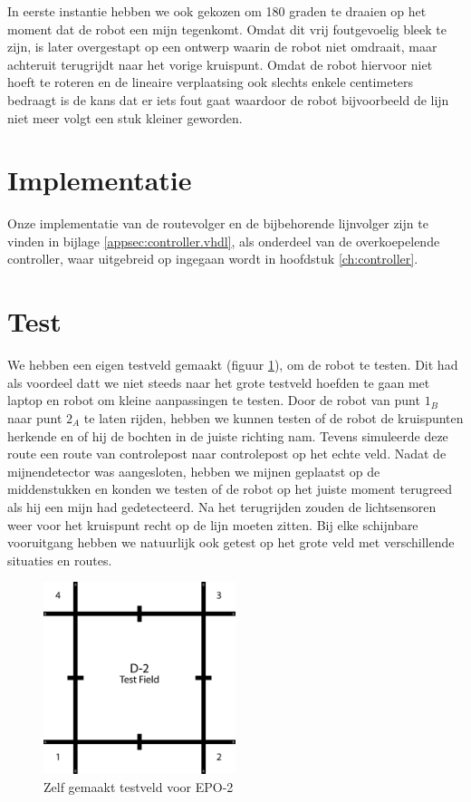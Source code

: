 \documentclass{report}
\begin{document}
In eerste instantie hebben we ook gekozen om 180 graden te draaien op het moment dat de robot een mijn tegenkomt. Omdat dit vrij foutgevoelig bleek te zijn, is later overgestapt op een ontwerp waarin de robot niet omdraait, maar achteruit terugrijdt naar het vorige kruispunt. Omdat de robot hiervoor niet hoeft te roteren en de lineaire verplaatsing ook slechts enkele centimeters bedraagt is de kans dat er iets fout gaat waardoor de robot bijvoorbeeld de lijn niet meer volgt een stuk kleiner geworden.

\section{Implementatie}
Onze implementatie van de routevolger en de bijbehorende lijnvolger zijn te vinden in bijlage \ref{appsec:controller.vhdl}, als onderdeel van de overkoepelende controller, waar uitgebreid op ingegaan wordt in hoofdstuk \ref{ch:controller}.

\section{Test}
We hebben een eigen testveld gemaakt (figuur \ref{fig:testfield}), om de robot te testen. Dit had als voordeel datt we niet steeds naar het grote testveld hoefden te gaan met laptop en robot om kleine aanpassingen te testen.
Door de robot van punt $1_B$ naar punt $2_A$ te laten rijden, hebben we kunnen testen of de robot de kruispunten herkende en of hij de bochten in de juiste richting nam. Tevens simuleerde deze route een route van controlepost naar controlepost op het echte veld.
Nadat de mijnendetector was aangesloten, hebben we mijnen geplaatst op de middenstukken en konden we testen of de robot op het juiste moment terugreed als hij een mijn had gedetecteerd. Na het terugrijden zouden de lichtsensoren weer voor het kruispunt recht op de lijn moeten zitten.
Bij elke schijnbare vooruitgang hebben we natuurlijk ook getest op het grote veld met verschillende situaties en routes.

\begin{figure}[H]
	\centering
	\includegraphics[width=0.5\textwidth]{d-2_test_field.png}
	\caption{Zelf gemaakt testveld voor EPO-2}
	\label{fig:testfield}
\end{figure}
\end{document}
